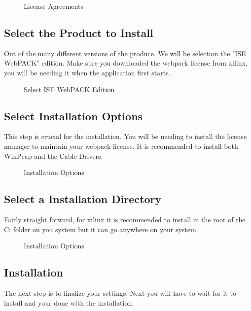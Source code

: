 \documentclass[letter]{article}
\begin{document}
\begin{figure}[!htbp]
  \centering
  \caption{License Agreements}
\end{figure}

\subsection{Select the Product to Install}
Out of the many different versions of the produce. We will be selection the "ISE WebPACK" edition. Make sure you downloaded the webpack license from xilinx, you will be needing it when the application first starts.

\begin{figure}[!htbp]
  \centering
  \caption{Select ISE WebPACK Edition}
\end{figure}

\subsection{Select Installation Options}
This step is crucial for the installation. You will be needing to install the license manager to maintain your webpack license. It is recommended to install both WinPcap and the Cable Drivers.

\begin{figure}[!htbp]
  \centering
  \caption{Installation Options}
\end{figure}

\subsection{Select a Installation Directory}
Fairly straight forward, for xilinx it is recommended to install in the root of the C: folder on you system but it can go anywhere on your system.

\begin{figure}[!htbp]
  \centering
  \caption{Installation Options}
\end{figure}

\subsection{Installation}
The next step is to finalize your settings. Next you will have to wait for it to install and your done with the installation.
\end{document}
